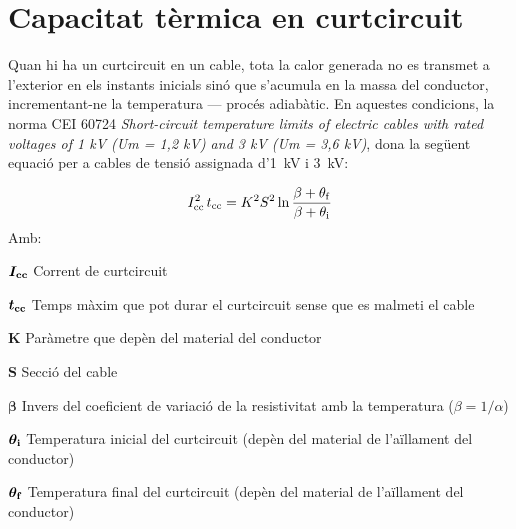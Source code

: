 \section{Capacitat tèrmica en curtcircuit}\label{ces:cables_Icc_termica}

Quan hi ha un curtcircuit en un cable, tota la calor generada no es transmet a l'exterior en els instants inicials sinó que s'acumula en la massa del conductor, incrementant-ne la temperatura --- procés adiabàtic. En aquestes condicions, la norma CEI 60724 \textit{Short-circuit temperature limits of electric cables with rated voltages of 1 kV (Um = 1,2 kV) and 3 kV (Um = 3,6 kV)}, dona la següent equació per a cables de tensió assignada d'\qty{1}{kV} i \qty{3}{kV}:

\begin{equation}
   I_\mathrm{cc}^2 \,t_\mathrm{cc} = K^2 S^2 \ln \frac{\beta + \theta_\mathrm{f}}{\beta + \theta_\mathrm{i}}
\end{equation}
Amb:

\begin{list}{}
   {\setlength{\labelwidth}{10mm} \setlength{\leftmargin}{12mm} \setlength{\labelsep}{2mm}}
   \item[\hspace{5mm}$\boldsymbol{I_\mathrm{cc}}$\hfill] Corrent de curtcircuit
   \item[\hspace{5mm}$\boldsymbol{t_\mathrm{cc}}$\hfill] Temps màxim que pot durar el curtcircuit sense que es malmeti el cable
   \item[\hspace{5mm}$\boldsymbol{K}$\hfill] Paràmetre que depèn del material del conductor
   \item[\hspace{5mm}$\boldsymbol{S}$\hfill] Secció del cable
   \item[\hspace{5mm}$\boldsymbol{\beta}$\hfill] Invers del coeficient de variació de la resistivitat amb la temperatura ($\beta = 1/ \alpha$)
   \item[\hspace{5mm}$\boldsymbol{\theta_\mathrm{i}}$\hfill] Temperatura inicial del curtcircuit (depèn del material de l'aïllament del conductor)
   \item[\hspace{5mm}$\boldsymbol{\theta_\mathrm{f}}$\hfill] Temperatura final del curtcircuit (depèn del material de l'aïllament del conductor)
\end{list}

